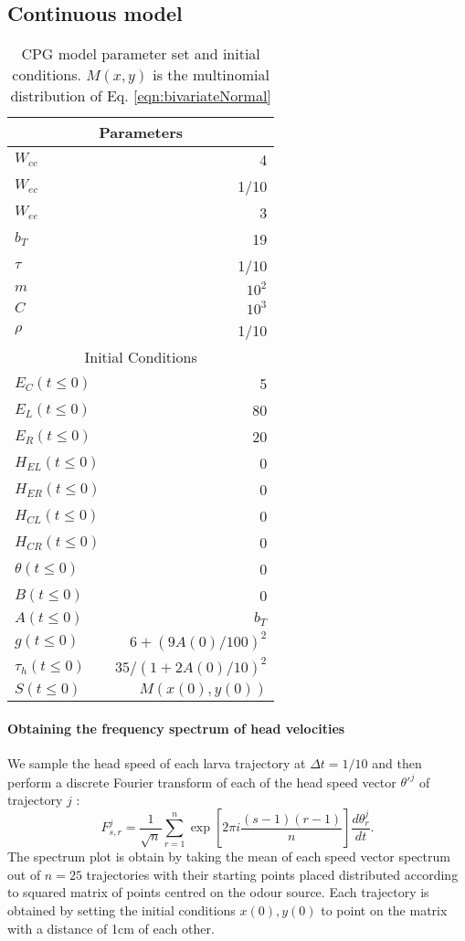 \documentclass[10pt,a4paper]{article}
\begin{document}
\subsection{Continuous model}
\begin{table}[]
 \centering
\begin{tabular}{| l | r |}
 \hline 
\multicolumn{2}{|c|}{Parameters} \\
 \hline 
$W_{cc}$ & 4 \\ \hline
$W_{ec}$ & 1/10\\ \hline
$W_{ee}$ & 3\\ \hline
$b_T$ & 19 \\ \hline
$\tau$ & 1/10 \\ \hline
$m$ & $10^2$ \\ \hline
$C$ & $10^3$ \\ \hline
$\rho$ & 1/10 \\ %
 \hline 
\multicolumn{2}{|c|}{Initial Conditions} \\
 \hline 
$E_C(t \leq 0)$ & 5 \\
$E_L(t \leq 0)$ & 80 \\
$E_R(t \leq 0)$ & 20 \\
$H_{EL}(t \leq 0)$ & 0 \\
$H_{ER}(t \leq 0)$ & 0 \\
$H_{CL}(t \leq 0)$ & 0 \\
$H_{CR}(t \leq 0)$ & 0 \\
$\theta(t \leq 0) $ & 0 \\
$B(t \leq 0) $ & 0 \\
$A(t \leq 0) $ & $b_T$ \\
$g(t \leq 0) $ & $6 + (9 A(0)/100)^2$ \\
$\tau_h(t \leq 0) $ & $35 / (1 + 2A(0)/10)^2$ \\ 
$S(t \leq 0) $ & $M(x(0),y(0))$ \\ \hline
\end{tabular}
 \caption{CPG model parameter set and initial conditions. $M(x,y)$ is the multinomial distribution of Eq. \eqref{eqn:bivariateNormal}}
\end{table}


\paragraph{Obtaining the frequency spectrum of head velocities}
We sample the head speed of each larva trajectory at $\Delta t = 1/10$ and then perform a discrete Fourier transform of each of the head speed vector $\theta'^j$ of trajectory $j$ :
\begin{equation}
F_{s,r}^j = \frac{1}{\sqrt{n}} \sum_{r=1}^n \exp{\left[2 \pi i \frac{ (s-1)(r-1)}{n}\right]} \frac{d\theta_r^j}{dt}.
\end{equation}
The spectrum plot is obtain by taking the mean of each speed vector spectrum out of $n=25$ trajectories with their starting points placed distributed according to squared matrix of points centred on the odour source. Each trajectory is obtained by setting the initial conditions $x(0),y(0)$ to point on the matrix with a distance of 1cm of each other.
\end{document}
